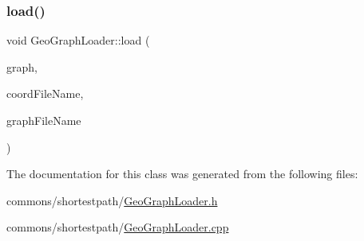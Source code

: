 \subsubsection{\texorpdfstring{load()}{load()}}
{\footnotesize\ttfamily void Geo\+Graph\+Loader\+::load (\begin{DoxyParamCaption}\item[{\mbox{\hyperlink{class_geo_graph}{Geo\+Graph}} \&}]{graph,  }\item[{std\+::string}]{coord\+File\+Name,  }\item[{std\+::string}]{graph\+File\+Name }\end{DoxyParamCaption})}



The documentation for this class was generated from the following files\+:\begin{DoxyCompactItemize}
\item 
commons/shortestpath/\mbox{\hyperlink{_geo_graph_loader_8h}{Geo\+Graph\+Loader.\+h}}\item 
commons/shortestpath/\mbox{\hyperlink{_geo_graph_loader_8cpp}{Geo\+Graph\+Loader.\+cpp}}\end{DoxyCompactItemize}
